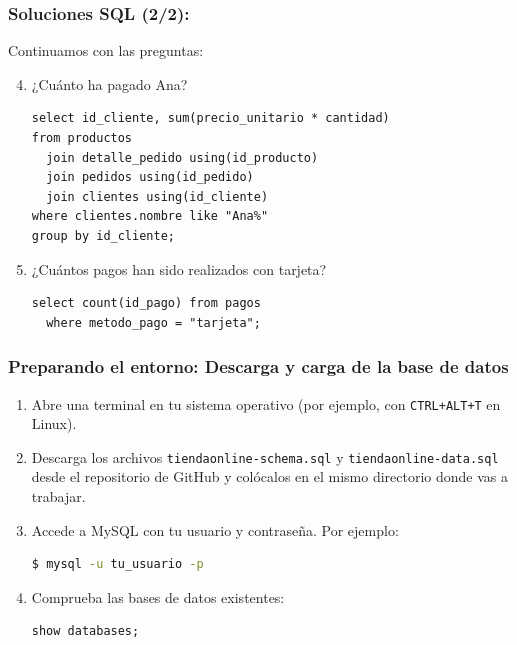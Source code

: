 \documentclass{beamer}
\begin{document}
\begin{frame}[fragile]
  \frametitle{Soluciones SQL (2/2):}

  Continuamos con las preguntas:

  \begin{enumerate}
    \setcounter{enumi}{3}
    \item ¿Cuánto ha pagado Ana?
    \begin{lstlisting}
select id_cliente, sum(precio_unitario * cantidad)
from productos
  join detalle_pedido using(id_producto)
  join pedidos using(id_pedido)
  join clientes using(id_cliente)
where clientes.nombre like "Ana%"
group by id_cliente;
    \end{lstlisting}

    \item ¿Cuántos pagos han sido realizados con tarjeta?
    \begin{lstlisting}
select count(id_pago) from pagos 
  where metodo_pago = "tarjeta";
    \end{lstlisting}
  \end{enumerate}
\end{frame}



\begin{frame}[fragile]
  \frametitle{Preparando el entorno: Descarga y carga de la base de datos}

  \begin{enumerate}
    \item Abre una terminal en tu sistema operativo (por ejemplo, con \texttt{CTRL+ALT+T} en Linux).
    \item Descarga los archivos \texttt{tiendaonline-schema.sql} y \texttt{tiendaonline-data.sql} desde el repositorio de GitHub y colócalos en el mismo directorio donde vas a trabajar.
    \item Accede a MySQL con tu usuario y contraseña. Por ejemplo:
    \begin{lstlisting}[language=bash, backgroundcolor=\color{gray!10}]
$ mysql -u tu_usuario -p
    \end{lstlisting}
    \item Comprueba las bases de datos existentes:
    \begin{lstlisting}[language=SQL, backgroundcolor=\color{gray!10}]
show databases;
    \end{lstlisting}
  \end{enumerate}
\end{frame}
\end{document}
